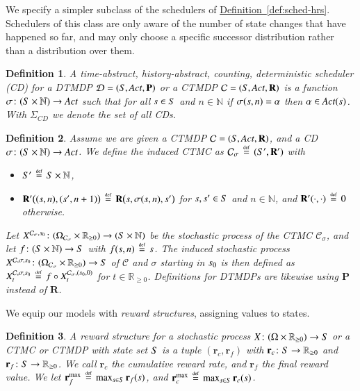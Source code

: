 \documentclass[10pt,twocolumn]{article}
\newtheorem{definition}{Definition}
\newcommand{\states} {{\ensuremath S}}
\newcommand{\state}  {{\ensuremath s}}
\newcommand{\nats}    {{\ensuremath {\mathbb{N}}}}
\newcommand{\reals}  {{\ensuremath {\mathbb{R}}}}
\newcommand{\sched}  {{\ensuremath {\sigma}}}
\newcommand{\acts}{\mathit{Act}}
\newcommand{\pmat}{\mathbf{P}}
\newcommand{\rmat}{\mathbf{R}}
\newcommand{\dmodel}{\mathcal{D}}
\newcommand{\cmodel}{\mathcal{C}}
\newcommand{\act}{\alpha}
\newcommand{\schedscd}{\Sigma_\mathit{CD}}
\newcommand{\frew}{\mathbf{r}_f}
\newcommand{\crew}{\mathbf{r}_c}
\newcommand{\stopro}{X}
\newcommand{\samspace}[1]{\Omega_{#1}}
\newcommand{\refdef}[1]{\texorpdfstring{\hyperref[def:#1]{Definition~\ref*{def:#1}}}{Definition \ref*{def:#1}}}
\newcommand{\defeq}{\,\stackrel{\mbox{\rm {\tiny def}}}{=}\,}
\begin{document}
We specify a simpler subclass of the schedulers of \refdef{sched-hrs}.
Schedulers of this class are only aware of the number of state changes that have
happened so far, and may only choose a specific successor distribution rather
than a distribution over them.
\begin{definition}
  \label{def:sched-cd}
A \emph{time-abstract, history-abstract, counting, deterministic scheduler
  (CD)} for a DTMDP $\dmodel = (\states, \acts, \pmat)$ or a CTMDP $\cmodel =
  (\states, \acts, \rmat)$ is a function $\sched\colon (\states \times \nats) \to
  \acts$ such that for all $\state \in \states$ and $n \in \nats$ if
  $\sched(\state, n) = \act$ then $\act \in \acts(\state)$.
  With  $\schedscd$ we denote the set of all CDs.
\end{definition}

\begin{definition}
  \label{def:induced-ctmc}
  Assume we are given a CTMDP $\cmodel = (\states, \acts, \rmat)$, and a CD $\sched\colon (\states\times \nats) \to \acts$.
  We define the \emph{induced CTMC} as $\cmodel_\sched \defeq (\states', \rmat')$ with
\begin{itemize}
  \item $\states' \defeq \states \times \nats$,
  \item $\rmat'\bigl((\state, n), (\state', n+1)\bigr) \defeq \rmat\bigl(\state, \sched(\state, n), \state'\bigr)$ for $\state, \state' \in \states$ and $n \in \nats$, and $\rmat'(\cdot,\cdot) \defeq 0$ otherwise.
  \end{itemize}
Let $\stopro^{\cmodel_\sched,\state_0}\colon (\samspace{\cmodel_\sched} \times \reals_{\geq 0}) \to (\states \times \nats)$ 
  be the stochastic process of the CTMC $\cmodel_\sched$, and let $f\colon (\states \times \nats) \to \states$ with $f(\state, n) \defeq \state$.
  The \emph{induced stochastic process} $\stopro^{\cmodel,\sched,\state_0}\colon (\samspace{\cmodel_\sched} \times \reals_{\geq 0}) \to \states$ of $\cmodel$ and $\sched$ starting in $\state_0$ is then defined as $\stopro^{\cmodel,\sched,\state_0}_t \defeq f \circ \stopro^{\cmodel_\sched,(\state_0,0)}_t$ for $t \in \reals_{\geq 0}$.
  Definitions for DTMDPs are likewise using $\pmat$ instead of $\rmat$.
\end{definition}

We equip our models with \emph{reward structures}, assigning values to states.
\begin{definition}
\label{def:reward-structure}
  A \emph{reward structure} for a stochastic process $\stopro\colon (\Omega \times \reals_{\geq 0}) \to \states$ or a CTMC or CTMDP with state set $\states$ is a tuple $(\crew, \frew)$ with $\crew\colon \states \to \reals_{\geq 0}$ and $\frew\colon \states \to \reals_{\geq 0}$.
  We call $\crew$ the \emph{cumulative reward rate}, and $\frew$ the \emph{final reward value}.
  We let $\frew^{\max} \defeq \max_{\state \in \states} \frew(\state)$, and $\crew^{\max} \defeq \max_{\state \in \states} \crew(\state)$.
\end{definition}
\end{document}
